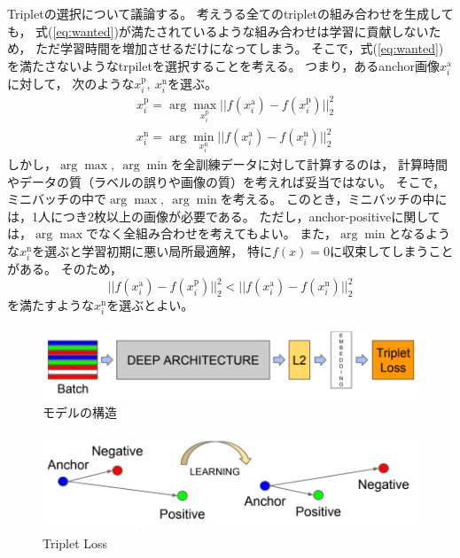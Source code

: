 \documentclass[dvipdfmx, fleqn]{jsarticle}
\begin{document}
Tripletの選択について議論する。
考えうる全てのtripletの組み合わせを生成しても，
式(\ref{eq:wanted})が満たされているような組み合わせは学習に貢献しないため，
ただ学習時間を増加させるだけになってしまう。
そこで，式(\ref{eq:wanted})を満たさないようなtrpiletを選択することを考える。
つまり，あるanchor画像\(x_i^\mathrm{a}\)に対して，
次のような\(x_i^\mathrm{p},\ x_i^\mathrm{n}\)を選ぶ。
\begin{align*}
    & x_i^\mathrm{p} = \arg\max_{x_i^\mathrm{p}} ||f(x_i^\mathrm{a}) - f(x_i^\mathrm{p})||_2^2 \\
    & x_i^\mathrm{n} = \arg\min_{x_i^\mathrm{n}} ||f(x_i^\mathrm{a}) - f(x_i^\mathrm{n})||_2^2
\end{align*}
しかし，\(\arg\max,\ \arg\min\)を全訓練データに対して計算するのは，
計算時間やデータの質（ラベルの誤りや画像の質）を考えれば妥当ではない。
そこで，ミニバッチの中で\(\arg\max,\ \arg\min\)を考える。
このとき，ミニバッチの中には，1人につき2枚以上の画像が必要である。
ただし，anchor-positiveに関しては，\(\arg\max\)でなく全組み合わせを考えてもよい。
また，\(\arg\min\)となるような\(x_i^\mathrm{n}\)を選ぶと学習初期に悪い局所最適解，
特に\(f(x) = 0\)に収束してしまうことがある。
そのため，
\begin{equation}
    ||f(x_i^\mathrm{a}) - f(x_i^\mathrm{p})||_2^2 < ||f(x_i^\mathrm{a}) - f(x_i^\mathrm{n})||_2^2
\end{equation}
を満たすような\(x_i^\mathrm{n}\)を選ぶとよい。


\begin{figure}[H]
    \centering
    \includegraphics[clip, width=15cm]{./figures/model_structure}
    \caption{モデルの構造}
    \label{fig:model_structure}
\end{figure}


\begin{figure}[H]
    \centering
    \includegraphics[clip, width=15cm]{./figures/triplet_loss}
    \caption{Triplet Loss}
    \label{fig:triplet_loss}
\end{figure}
\end{document}
